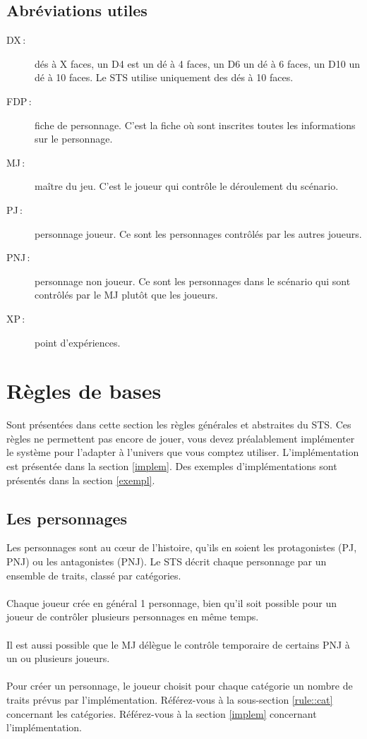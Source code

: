 \documentclass[a4paper,10pt,twoside,twocolumn]{article}
\begin{document}
 \subsection{Abréviations utiles}
 
\begin{description}
 \item[DX\,:] dés à X faces, un D4 est un dé à 4 faces, un D6 un dé à 6 faces, un D10 un dé à 10 faces. Le STS utilise uniquement des dés à 10 faces.
 \item[FDP\,:] fiche de personnage. C'est la fiche où sont inscrites toutes les informations sur le personnage.
 \item[MJ\,:] maître du jeu. C'est le joueur qui contrôle le déroulement du scénario.
 \item[PJ\,:] personnage joueur. Ce sont les personnages contrôlés par les autres joueurs.
 \item[PNJ\,:] personnage non joueur. Ce sont les personnages dans le scénario qui sont contrôlés par le MJ plutôt que les joueurs.
 \item[XP\,:] point d'expériences.
\end{description}
 
 \section{Règles de bases}
 \label{rule}
 Sont présentées dans cette section les règles générales et abstraites du STS. Ces règles ne permettent pas encore de jouer, vous devez préalablement implémenter le système pour l'adapter à l'univers que vous comptez utiliser. L'implémentation est présentée dans la section \ref{implem}. Des exemples d'implémentations sont présentés dans la section \ref{exempl}.
 
 \subsection{Les personnages}
 \label{rule::char}
  Les personnages sont au cœur de l'histoire, qu'ils en soient les protagonistes (PJ, PNJ) ou les antagonistes (PNJ). Le STS décrit chaque personnage par un ensemble de traits, classé par catégories.\\
  \\
  Chaque joueur crée en général 1 personnage, bien qu'il soit possible pour un joueur de contrôler plusieurs personnages en même temps.\\
  \\
  Il est aussi possible que le MJ délègue le contrôle temporaire de certains PNJ à un ou plusieurs joueurs.\\
  \\
  Pour créer un personnage, le joueur choisit pour chaque catégorie un nombre de traits prévus par l'implémentation. Référez-vous à la sous-section \ref{rule::cat} concernant les catégories. Référez-vous à la section \ref{implem} concernant l'implémentation.\\
  \\
 
\end{document}
